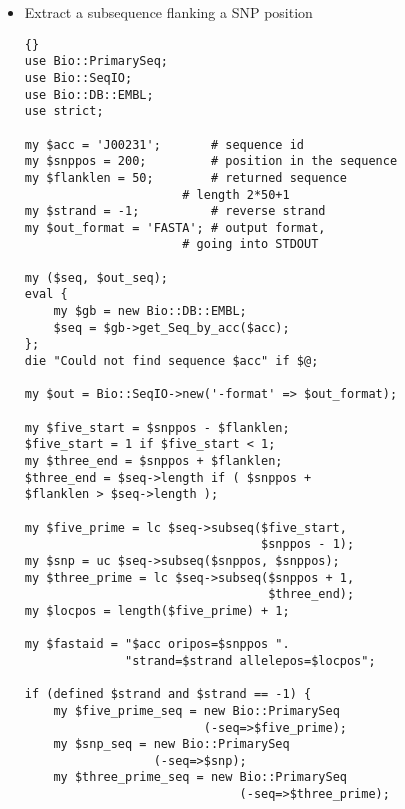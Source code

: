 \documentclass[twocolumn]{article}
\begin{document}
\begin{itemize}
\begin{scriptsize}
\begin{lstlisting}{}
use Bio::SearchIO;
# Let's parse a NCBI blast XML-ified report  
my $search = new Bio::SearchIO
         (-format => 'blastxml',
          -file   => 'report.xml');
my @HitsToSave;
my $cutoffe = 0.001;
my $cutofflen = 120;
while( my $result = $search->next_result ) {
  printf "query is %s\n", $result->query_name;
  HIT: while( my $hit = $result->next_hit ) {
   printf "hit is %s\n", $hit->name;
   while( my $hsp = $hit->next_hsp ) {
    if( $hsp->evalue < $cutoffe &&
       $hsp->length('total') >= $cutofflen ) 
       {
	    push @HitsToSave, $hit;
	    next HIT;
       } 
   }
  }
}

# now one might process hits that meet criteria
\end{lstlisting}
\end{scriptsize}

\item Extract a subsequence flanking a SNP position
\begin{scriptsize}
\begin{lstlisting}{}
use Bio::PrimarySeq;
use Bio::SeqIO;
use Bio::DB::EMBL;
use strict;

my $acc = 'J00231';       # sequence id
my $snppos = 200;         # position in the sequence
my $flanklen = 50;        # returned sequence 
	                  # length 2*50+1
my $strand = -1;          # reverse strand
my $out_format = 'FASTA'; # output format, 
	                  # going into STDOUT

my ($seq, $out_seq);
eval {
    my $gb = new Bio::DB::EMBL;
    $seq = $gb->get_Seq_by_acc($acc);
};
die "Could not find sequence $acc" if $@;

my $out = Bio::SeqIO->new('-format' => $out_format);

my $five_start = $snppos - $flanklen;
$five_start = 1 if $five_start < 1;
my $three_end = $snppos + $flanklen;
$three_end = $seq->length if ( $snppos + 
$flanklen > $seq->length );

my $five_prime = lc $seq->subseq($five_start, 
                                 $snppos - 1);
my $snp = uc $seq->subseq($snppos, $snppos);
my $three_prime = lc $seq->subseq($snppos + 1, 
                                  $three_end); 
my $locpos = length($five_prime) + 1;

my $fastaid = "$acc oripos=$snppos ".
              "strand=$strand allelepos=$locpos";

if (defined $strand and $strand == -1) {
    my $five_prime_seq = new Bio::PrimarySeq
                         (-seq=>$five_prime);
    my $snp_seq = new Bio::PrimarySeq
	              (-seq=>$snp);
    my $three_prime_seq = new Bio::PrimarySeq
                              (-seq=>$three_prime);


\end{lstlisting}
\end{scriptsize}
\end{itemize}
\end{document}
